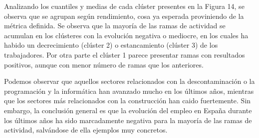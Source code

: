 \documentclass[Universitat de
València,article,submit,moreauthors,pdftex]{Definitions/mdpi}
\begin{document}
Analizando los cuantiles y medias de cada clúster presentes en la Figura
14, se observa que se agrupan según rendimiento, cosa ya esperada
proviniendo de la métrica definida. Se observa que la mayoría de las
ramas de actividad se acumulan en los clústeres con la evolución
negativa o mediocre, en los cuales ha habido un decrecimiento (clúster
2) o estancamiento (clúster 3) de los trabajadores. Por otra parte el
clúster 1 parece presentar ramas con resultados positivos, aunque con
menor número de ramas que los anteriores.

Podemos observar que aquellos sectores relacionados con la
descontaminación o la programación y la informática han avanzado mucho
en los últimos años, mientras que los sectores más relacionados con la
construcción han caido fuertemente. Sin embargo, la conclusión general
es que la evolución del empleo en España durante los últimos años ha
sido marcadamente negativa para la mayoría de las ramas de actividad,
salvándose de ella ejemplos muy concretos. \newpage


\vspace{6pt}











\end{document}
